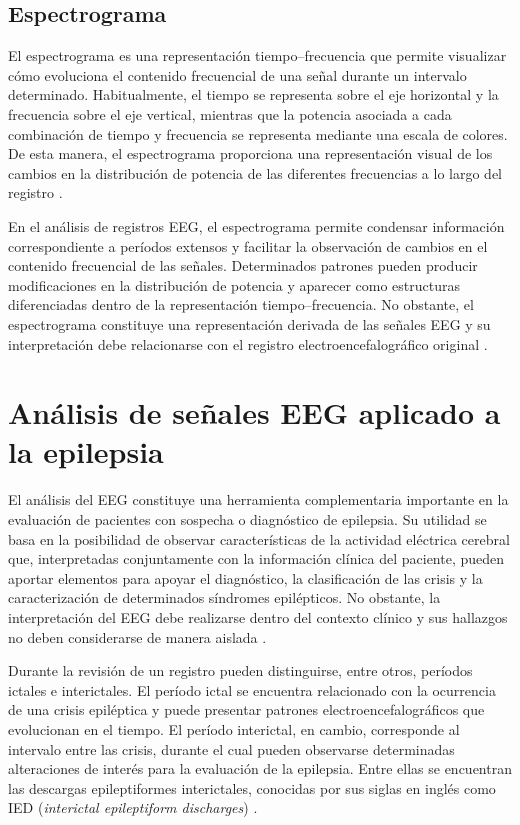 \subsection{Espectrograma}
\label{subsec:espectrograma}

El espectrograma es una representación tiempo--frecuencia que permite
visualizar cómo evoluciona el contenido frecuencial de una señal durante un
intervalo determinado. Habitualmente, el tiempo se representa sobre el eje
horizontal y la frecuencia sobre el eje vertical, mientras que la potencia
asociada a cada combinación de tiempo y frecuencia se representa mediante
una escala de colores. De esta manera, el espectrograma proporciona una
representación visual de los cambios en la distribución de potencia de las
diferentes frecuencias a lo largo del registro
\citep{Ng2022EEGSpectrograms}.

En el análisis de registros EEG, el espectrograma permite condensar
información correspondiente a períodos extensos y facilitar la observación
de cambios en el contenido frecuencial de las señales. Determinados patrones
pueden producir modificaciones en la distribución de potencia y aparecer
como estructuras diferenciadas dentro de la representación
tiempo--frecuencia. No obstante, el espectrograma constituye una
representación derivada de las señales EEG y su interpretación debe
relacionarse con el registro electroencefalográfico original
\citep{Ng2022EEGSpectrograms}.

\section{Análisis de señales EEG aplicado a la epilepsia}
\label{sec:analisis-eeg-epilepsia}

El análisis del EEG constituye una herramienta complementaria
importante en la evaluación de pacientes con sospecha o
diagnóstico de epilepsia. Su utilidad se basa en la posibilidad de observar características de la actividad eléctrica cerebral que, interpretadas conjuntamente con la información clínica del paciente, pueden aportar elementos para apoyar el diagnóstico, la clasificación de las crisis y la caracterización de
determinados síndromes epilépticos. No obstante, la interpretación del EEG
debe realizarse dentro del contexto clínico y sus hallazgos no deben
considerarse de manera aislada \citep{NoachtarRemi2009}.

Durante la revisión de un registro pueden distinguirse, entre otros, períodos
ictales e interictales. El período ictal se encuentra relacionado con la
ocurrencia de una crisis epiléptica y puede presentar patrones
electroencefalográficos que evolucionan en el tiempo. El período interictal,
en cambio, corresponde al intervalo entre las crisis, durante el cual pueden
observarse determinadas alteraciones de interés para la evaluación de la
epilepsia. Entre ellas se encuentran las descargas epileptiformes
interictales, conocidas por sus siglas en inglés como IED
(\textit{interictal epileptiform discharges})
\citep{NoachtarRemi2009}.

